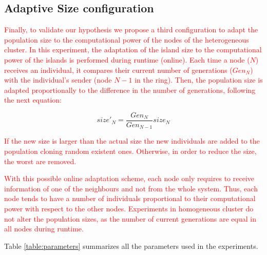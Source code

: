 \documentclass[final,1p,times]{elsarticle}
\begin{document}
\subsection{Adaptive Size configuration}

\textcolor{red}{Finally, to validate our hypothesis we propose a third configuration to adapt the population size to the computational power of the nodes of the heterogeneous cluster. In this experiment, the adaptation of the island size to the computational power of the islands is performed during runtime (online).  Each time a node ($N$) receives an individual, it compares their current number of generations ($Gen_{N}$) with the individual's sender (node $N-1$ in the ring). Then, the population size is adapted proportionally to the difference in the number of generations, following the next equation:}

\begin{equation}
size'_{N}=\dfrac{Gen_{N}}{Gen_{N-1}}size_{N}
\end{equation}

\textcolor{red}{If the new size is larger than the actual size the new individuals are added to the population cloning random existent ones. Otherwise, in order to reduce the size, the worst are removed.}

\textcolor{red}{With this possible online adaptation scheme, each node only requires to receive information of one of the neighbours and not from the whole system. Thus, each node tends to have a number of individuals proportional to their computational power with respect to the other nodes. Experiments in homogeneous cluster do not alter the population sizes, as the number of current generations are equal in all nodes during runtime.}

Table \ref{table:parameters} summarizes all the parameters used in the experiments.
\end{document}
